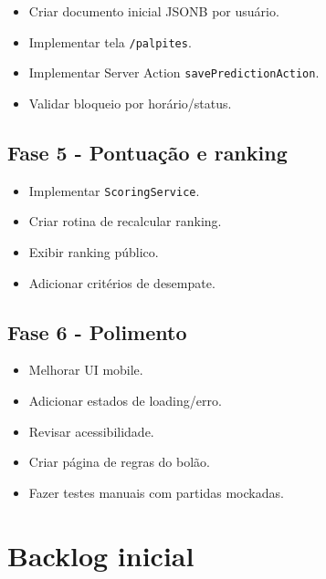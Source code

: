 \documentclass[12pt,a4paper]{article}
\begin{document}
\begin{itemize}
  \item Criar documento inicial JSONB por usuário.
  \item Implementar tela \texttt{/palpites}.
  \item Implementar Server Action \texttt{savePredictionAction}.
  \item Validar bloqueio por horário/status.
\end{itemize}

\subsection{Fase 5 - Pontuação e ranking}

\begin{itemize}
  \item Implementar \texttt{ScoringService}.
  \item Criar rotina de recalcular ranking.
  \item Exibir ranking público.
  \item Adicionar critérios de desempate.
\end{itemize}

\subsection{Fase 6 - Polimento}

\begin{itemize}
  \item Melhorar UI mobile.
  \item Adicionar estados de loading/erro.
  \item Revisar acessibilidade.
  \item Criar página de regras do bolão.
  \item Fazer testes manuais com partidas mockadas.
\end{itemize}

\section{Backlog inicial}
\end{document}
